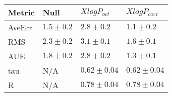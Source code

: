 \begin{tabular}{| l |l |l | l |} 
\hline 
Metric & Null  & $XlogP_{oct}$ & $XlogP_{corr}$ \\ 
\hline 
AveErr & $ 1.5 \pm 0.2 $ & $ 2.8 \pm 0.2 $ & $ 1.1 \pm 0.2 $ \\ 
RMS & $ 2.3 \pm 0.2 $ & $ 3.1 \pm 0.1 $ & $ 1.6 \pm 0.1 $ \\ 
AUE & $ 1.8 \pm 0.2 $ & $ 2.8 \pm 0.2 $ & $ 1.3 \pm 0.1 $ \\ 
tau & N/A & $ 0.62 \pm 0.04 $ & $ 0.62 \pm 0.04 $ \\ 
R & N/A & $ 0.78 \pm 0.04 $ & $ 0.78 \pm 0.04 $ \\ 
\hline
\end{tabular}
